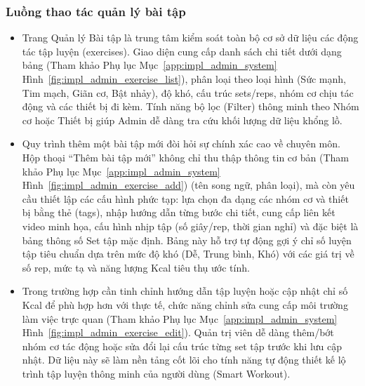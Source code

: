 \subsubsection{Luồng thao tác quản lý bài tập}
\begin{itemize}
    \item Trang Quản lý Bài tập là trung tâm kiểm soát toàn bộ cơ sở dữ liệu các động tác tập luyện (exercises). Giao diện cung cấp danh sách chi tiết dưới dạng bảng (Tham khảo Phụ lục Mục~\ref{app:impl_admin_system} Hình~\ref{fig:impl_admin_exercise_list}), phân loại theo loại hình (Sức mạnh, Tim mạch, Giãn cơ, Bật nhảy), độ khó, cấu trúc sets/reps, nhóm cơ chịu tác động và các thiết bị đi kèm. Tính năng bộ lọc (Filter) thông minh theo Nhóm cơ hoặc Thiết bị giúp Admin dễ dàng tra cứu khối lượng dữ liệu khổng lồ.


    \item Quy trình thêm một bài tập mới đòi hỏi sự chính xác cao về chuyên môn. Hộp thoại ``Thêm bài tập mới'' không chỉ thu thập thông tin cơ bản (Tham khảo Phụ lục Mục~\ref{app:impl_admin_system} Hình~\ref{fig:impl_admin_exercise_add}) (tên song ngữ, phân loại), mà còn yêu cầu thiết lập các cấu hình phức tạp: lựa chọn đa dạng các nhóm cơ và thiết bị bằng thẻ (tags), nhập hướng dẫn từng bước chi tiết, cung cấp liên kết video minh họa, cấu hình nhịp tập (số giây/rep, thời gian nghỉ) và đặc biệt là bảng thông số Set tập mặc định. Bảng này hỗ trợ tự động gợi ý chỉ số luyện tập tiêu chuẩn dựa trên mức độ khó (Dễ, Trung bình, Khó) với các giá trị về số rep, mức tạ và năng lượng Kcal tiêu thụ ước tính.


    \item Trong trường hợp cần tinh chỉnh hướng dẫn tập luyện hoặc cập nhật chỉ số Kcal để phù hợp hơn với thực tế, chức năng chỉnh sửa cung cấp môi trường làm việc trực quan (Tham khảo Phụ lục Mục~\ref{app:impl_admin_system} Hình~\ref{fig:impl_admin_exercise_edit}). Quản trị viên dễ dàng thêm/bớt nhóm cơ tác động hoặc sửa đổi lại cấu trúc từng set tập trước khi lưu cập nhật. Dữ liệu này sẽ làm nền tảng cốt lõi cho tính năng tự động thiết kế lộ trình tập luyện thông minh của người dùng (Smart Workout).

\end{itemize}

